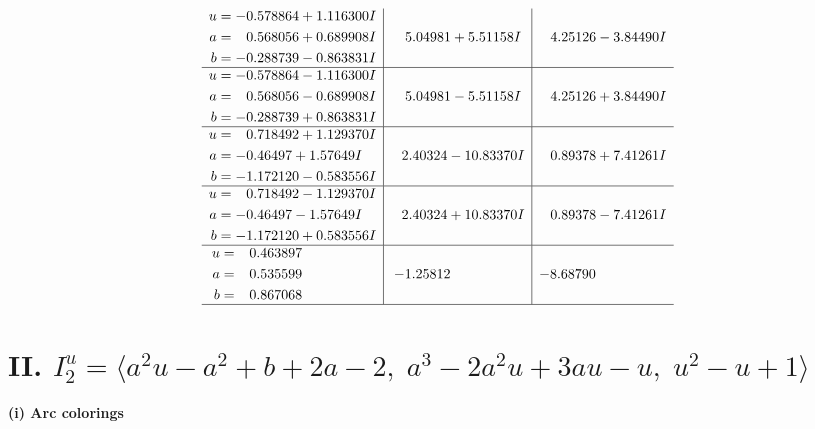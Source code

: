 \documentclass[1p]{elsarticle_modified}
\theoremstyle{definition}
\begin{document}
$$\begin{array}{c|c|c}
\begin{aligned}
u &= -0.578864 + 1.116300 I \\
a &= \phantom{-}0.568056 + 0.689908 I \\
b &= -0.288739 - 0.863831 I\end{aligned}
 & \phantom{-}5.04981 + 5.51158 I & \phantom{-}4.25126 - 3.84490 I \\ \hline\begin{aligned}
u &= -0.578864 - 1.116300 I \\
a &= \phantom{-}0.568056 - 0.689908 I \\
b &= -0.288739 + 0.863831 I\end{aligned}
 & \phantom{-}5.04981 - 5.51158 I & \phantom{-}4.25126 + 3.84490 I \\ \hline\begin{aligned}
u &= \phantom{-}0.718492 + 1.129370 I \\
a &= -0.46497 + 1.57649 I \\
b &= -1.172120 - 0.583556 I\end{aligned}
 & \phantom{-}2.40324 - 10.83370 I & \phantom{-}0.89378 + 7.41261 I \\ \hline\begin{aligned}
u &= \phantom{-}0.718492 - 1.129370 I \\
a &= -0.46497 - 1.57649 I \\
b &= -1.172120 + 0.583556 I\end{aligned}
 & \phantom{-}2.40324 + 10.83370 I & \phantom{-}0.89378 - 7.41261 I \\ \hline\begin{aligned}
u &= \phantom{-}0.463897\phantom{ +0.000000I} \\
a &= \phantom{-}0.535599\phantom{ +0.000000I} \\
b &= \phantom{-}0.867068\phantom{ +0.000000I}\end{aligned}
 & -1.25812\phantom{ +0.000000I} & -8.68790\phantom{ +0.000000I}\\
 \hline 
 \end{array}$$\newpage\newpage\renewcommand{\arraystretch}{1}
\centering \section*{II. $I^u_{2}= \langle a^2 u- a^2+b+2 a-2,\;a^3-2 a^2 u+3 a u- u,\;u^2- u+1 \rangle$}
\flushleft \textbf{(i) Arc colorings}\\
\end{document}
